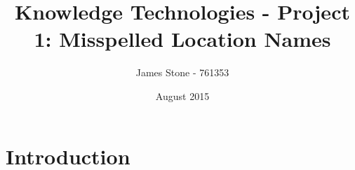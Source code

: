 \documentclass[a4paper]{article}
\title{Knowledge Technologies - Project 1: Misspelled Location Names}
\author{James Stone - 761353}}
\date{August 2015}
\begin{document}
\maketitle

\begin{abstract}
\end{abstract}

\section{Introduction}
\end{document}
